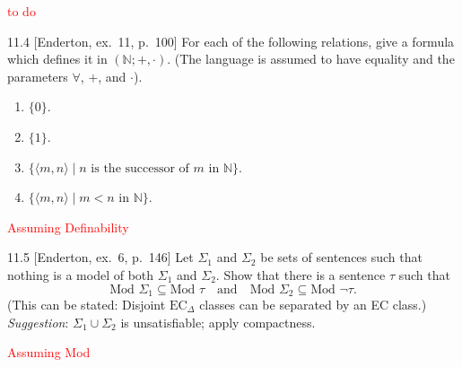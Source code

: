 \textcolor{red}{to do}

\begin{exercise}{11.4}
  [Enderton, ex.~11, p.~100]
  For each of the following relations, give a formula which defines it in \((\mathbb{N}; +, \cdot)\). (The language is assumed to have equality and the parameters \(\forall\), \(+\), and \(\cdot\)).
  \begin{enumerate}
    \item \(\{0\}\).
    \item \(\{1\}\).
    \item \(\{ \langle m, n \rangle \mid n \text{ is the successor of } m \text{ in } \mathbb{N} \}\).
    \item \(\{ \langle m, n \rangle \mid m < n \text{ in } \mathbb{N} \}\).\qedhere
  \end{enumerate}
\end{exercise}

\textcolor{red}{
  Assuming Definability
}

\begin{exercise}{11.5}
  [Enderton, ex.~6, p.~146]
  Let $\Sigma_1$ and $\Sigma_2$ be sets of sentences such that nothing is a model of both $\Sigma_1$ and $\Sigma_2$. Show that there is a sentence $\tau$ such that
  \[
    \text{Mod } \Sigma_1 \subseteq \text{Mod } \tau \quad \text{and} \quad \text{Mod } \Sigma_2 \subseteq \text{Mod } \lnot \tau.
  \]
  (This can be stated: Disjoint $\text{EC}_\Delta$ classes can be separated by an EC class.) \textit{Suggestion}: $\Sigma_1 \cup \Sigma_2$ is unsatisfiable; apply compactness.
\end{exercise}

\textcolor{red}{Assuming Mod}

